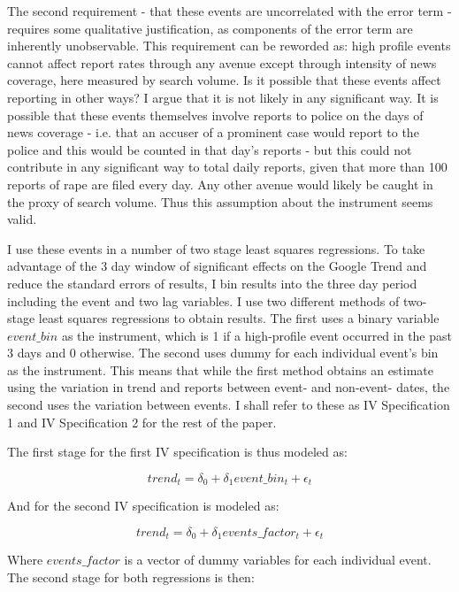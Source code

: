 \documentclass[AER,draftmode]{AEA}
\begin{document}
The second requirement - that these events are uncorrelated with the error term - requires some qualitative justification, as components of the error term are inherently unobservable. This requirement can be reworded as: high profile events cannot affect report rates through any avenue except through intensity of news coverage, here measured by search volume. Is it possible that these events affect reporting in other ways? I argue that it is not likely in any significant way. It is possible that these events themselves involve reports to police on the days of news coverage - i.e. that an accuser of a prominent case would report to the police and this would be counted in that day's reports - but this could not contribute in any significant way to total daily reports, given that more than 100 reports of rape are filed every day. Any other avenue  would likely be caught in the proxy of search volume. Thus this assumption about the instrument seems valid.

I use these events in a number of two stage least squares regressions. To take advantage of the 3 day window of significant effects on the Google Trend and reduce the standard errors of results, I bin results into the three day period including the event and two lag variables. I use two different methods of two-stage least squares regressions to obtain results. The first uses a binary variable $event\_bin$ as the instrument, which is 1 if a high-profile event occurred in the past 3 days and 0 otherwise. The second uses dummy for each individual event's bin as the instrument. This means that while the first method obtains an estimate using the variation in trend and reports between event- and non-event- dates, the second uses the variation between events. I shall refer to these as IV Specification 1 and IV Specification 2 for the rest of the paper.  

The first stage for the first IV specification is thus modeled as:

$$ 
trend_{t} = \delta_{0} + \delta_1 event\_bin_t + \epsilon_{t}
$$

And for the second IV specification is modeled as:

$$ 
trend_{t} = \delta_{0} + \delta_1 events\_factor_t + \epsilon_{t}
$$

Where $events\_factor$ is a vector of dummy variables for each individual event. The second stage for both regressions is then:
\end{document}
